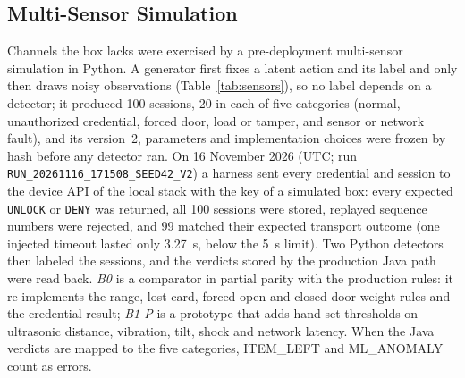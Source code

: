 \documentclass[sigconf,screen]{acmart}
\begin{document}
\subsection{Multi-Sensor Simulation}\label{sec:sim_eval}

Channels the box lacks were exercised by a pre-deployment multi-sensor simulation in Python. A generator first fixes a
latent action and its label and only then draws noisy observations (Table~\ref{tab:sensors}), so no label depends on a
detector; it produced 100 sessions, 20 in each of five categories (normal, unauthorized credential, forced door, load or
tamper, and sensor or network fault), and its version~2, parameters and implementation choices were frozen by hash
before any detector ran. On 16 November 2026 (UTC; run \texttt{RUN\_20261116\_171508\_SEED42\_V2}) a harness sent every
credential and session to the device API of the local stack with the key of a simulated box: every expected
\texttt{UNLOCK} or \texttt{DENY} was returned, all 100 sessions were stored, replayed sequence numbers were rejected,
and 99 matched their expected transport outcome (one injected timeout lasted only 3.27~s, below the 5~s limit). Two
Python detectors then labeled the sessions, and the verdicts stored by the production Java path were read back.
\emph{B0} is a comparator in partial parity with the production rules: it re-implements the range, lost-card,
forced-open and closed-door weight rules and the credential result; \emph{B1-P} is a prototype that adds hand-set
thresholds on ultrasonic distance, vibration, tilt, shock and network latency. When the Java verdicts are mapped to the
five categories, ITEM\_LEFT and ML\_ANOMALY count as errors.
\end{document}
